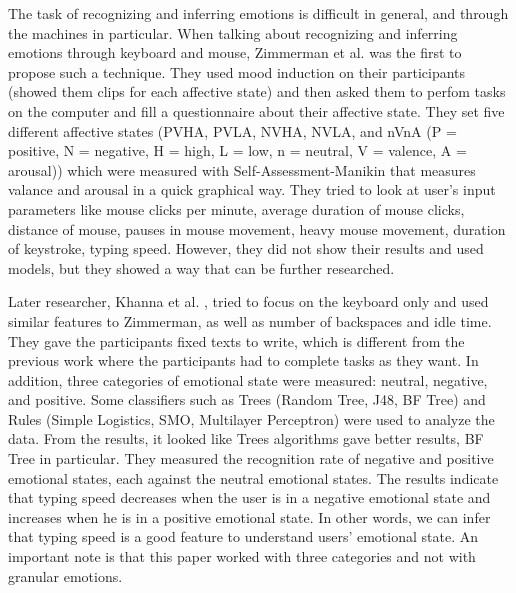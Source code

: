 \documentclass[../main.tex]{subfiles}
\begin{document}
The task of recognizing and inferring emotions is difficult in general, and 
through the machines in particular.  When talking about recognizing and inferring 
emotions through keyboard and mouse, Zimmerman et al.\cite{Zimmermann} was the first 
to propose such a technique. They used mood induction on their participants 
(showed them clips for each affective state) and then asked them to perfom tasks on 
the computer and fill a questionnaire about their affective state. They set five 
different affective states (PVHA, PVLA, NVHA, NVLA, and nVnA (P = positive, N = negative, 
H = high, L = low, n = neutral, V = valence, A = arousal)) which were measured with 
Self-Assessment-Manikin that measures valance and arousal in a quick graphical way. 
They tried to look at user’s input parameters like mouse clicks per minute, average 
duration of mouse clicks, distance of mouse, pauses in mouse movement, heavy mouse movement, 
duration of keystroke, typing speed. However, they did not show their results and used models, 
but they showed a way that can be further researched.
\par

Later researcher, Khanna et al. \cite{Khanna}, tried to focus on the keyboard only and used 
similar features to Zimmerman, as well as number of backspaces and idle time. 
They gave the participants fixed texts to write, which is different from the previous work 
where the participants had to complete tasks as they want. In addition, three categories of 
emotional state were measured: neutral, negative, and positive. Some classifiers such as Trees 
(Random Tree, J48, BF Tree) and Rules (Simple Logistics, SMO, Multilayer Perceptron) were used to 
analyze the data. From the results, it looked like Trees algorithms gave better results, BF Tree in 
particular. They measured the recognition rate of negative and positive emotional states, 
each against the neutral emotional states. The results indicate that typing speed decreases when 
the user is in a negative emotional state and increases when he is in a positive emotional state. 
In other words, we can infer that typing speed is a good feature to understand users' emotional state. 
An important note is that this paper worked with three categories and not with granular emotions.
\par
\end{document}
